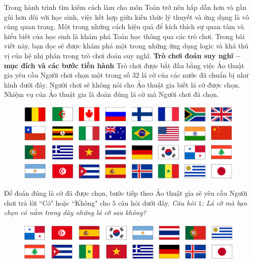 \begin{multicols}{2}
	Trong hành trình tìm kiếm cách làm cho môn Toán trở nên hấp dẫn hơn và gần gũi hơn đối với học sinh, việc kết hợp giữa kiến thức lý thuyết và ứng dụng là vô cùng quan trọng. Một trong những cách hiệu quả để kích thích sự quan tâm và hiểu biết của học sinh là khám phá Toán học thông qua các trò chơi. Trong bài viết này, bạn đọc sẽ được khám phá một trong những ứng dụng logic và khá thú vị của hệ nhị phân trong trò chơi đoán suy nghĩ. 
	\vskip 0.1cm
	\textbf{\color{hoccungpi}Trò chơi đoán suy nghĩ -- mục đích và các bước tiến hành}
	\vskip 0.1cm
	Trò chơi được bắt đầu bằng việc Ảo thuật gia yêu cầu Người chơi chọn một trong số $32$ lá cờ của các nước đã chuẩn bị như hình dưới đây.  Người chơi sẽ không nói cho Ảo thuật gia biết lá cờ được chọn. Nhiệm vụ của Ảo thuật gia là đoán đúng lá cờ mà Người chơi đã chọn. 
	\begin{figure}[H]
		\vspace*{-5pt}
		\centering
		\captionsetup{labelformat= empty, justification=centering}
		\includegraphics[width= 1\linewidth]{1}
		\vspace*{-15pt}
	\end{figure}
	Để đoán đúng là cờ đã được chọn, bước tiếp theo Ảo thuật gia sẽ yêu cầu Người chơi trả lời ``Có" hoặc ``Không" cho $5$ câu hỏi dưới đây. 
	\vskip 0.1cm
	\textit{Câu hỏi $1$: Lá cờ mà bạn chọn có nằm trong dãy những lá cờ sau không?}
	\begin{figure}[H]
		\vspace*{-5pt}
		\centering
		\captionsetup{labelformat= empty, justification=centering}
		\includegraphics[width= 1\linewidth]{2}
		\vspace*{-15pt}
	\end{figure}

\end{multicols}
